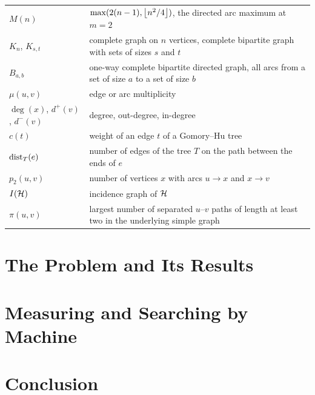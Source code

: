 \begin{longtable}{@{}>{\raggedright\arraybackslash}p{}>{\raggedright\arraybackslash}p{}@{}}
$M(n)$ & $\max(2(n-1),\left\lfloor n^2/4 \right\rfloor)$, the directed arc maximum at $m=2$ \\
$K_n$, $K_{s,t}$ & complete graph on $n$ vertices, complete bipartite graph with sets of sizes $s$ and $t$ \\
$B_{a,b}$ & one-way complete bipartite directed graph, all arcs from a set of size $a$ to a set of size $b$ \\
$\mu(u,v)$ & edge or arc multiplicity \\
$\deg(x)$, $d^+(v)$, $d^-(v)$ & degree, out-degree, in-degree \\
$c(t)$ & weight of an edge $t$ of a Gomory--Hu tree \\
$\operatorname{dist}_T(e)$ & number of edges of the tree $T$ on the path between the ends of $e$ \\
$p_2(u,v)$ & number of vertices $x$ with arcs $u\to x$ and $x\to v$ \\
$I(\mathcal{H})$ & incidence graph of $\mathcal{H}$ \\
$\pi(u,v)$ & largest number of separated $u$--$v$ paths of length at least two in the underlying simple graph \\
\end{longtable}
\endgroup

\tableofcontents


\cleardoublepage
{}

\chapter{The Problem and Its Results}\label{ch:basecases}


\chapter{Measuring and Searching by Machine}
\label{ch:machine}\label{ch:certify}\label{ch:discover}


\chapter{Conclusion}\label{ch:conclusion}





